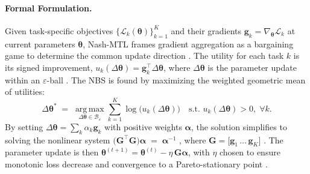 \paragraph*{Formal Formulation.}
Given task-specific objectives $\{\mathcal{L}_k(\boldsymbol{\theta})\}_{k=1}^{K}$ and their gradients $\mathbf{g}_k=\nabla_{\!\boldsymbol{\theta}}\mathcal{L}_k$ at current parameters $\boldsymbol{\theta}$, Nash-MTL frames gradient aggregation as a bargaining game to determine the common update direction \cite{nash}. The utility for each task $k$ is its signed improvement, $u_k(\Delta\boldsymbol{\theta})=\mathbf{g}_k^{\!\top}\!\Delta\boldsymbol{\theta}$, where $\Delta\boldsymbol{\theta}$ is the parameter update within an $\varepsilon$-ball \cite{nash}. The NBS is found by maximizing the weighted geometric mean of utilities:
\begin{equation}
\Delta\boldsymbol{\theta}^{*}\;=\;\operatorname*{arg\,max}_{\Delta\boldsymbol{\theta}\in\mathcal{B}_\varepsilon}
\sum_{k=1}^{K}\!\log\!\bigl(u_k(\Delta\boldsymbol{\theta})\bigr)
\quad\text{s.t. }u_k(\Delta\boldsymbol{\theta})>0,\;\forall k.
\label{eq:cbic:nbs}
\end{equation}
By setting $\Delta\boldsymbol{\theta}=\sum_{k}\alpha_k\mathbf{g}_k$ with positive weights $\boldsymbol{\alpha}$, the solution simplifies to solving the nonlinear system $\bigl(\mathbf{G}^{\!\top}\mathbf{G}\bigr)\boldsymbol{\alpha} \;=\; \boldsymbol{\alpha}^{-1}$ \cite{nash}, where $\mathbf{G}=\bigl[\mathbf{g}_1\,\ldots\,\mathbf{g}_K\bigr]$ \cite{nash}. The parameter update is then $\boldsymbol{\theta}^{(t+1)} =\boldsymbol{\theta}^{(t)}-\eta\,\mathbf{G}\boldsymbol{\alpha}$, with $\eta$ chosen to ensure monotonic loss decrease and convergence to a Pareto-stationary point \cite{nash}.

